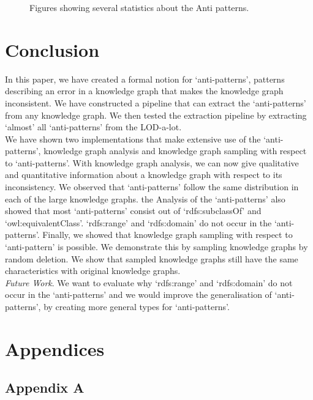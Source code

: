 \documentclass{article}
\begin{document}
\begin{figure}[ht]
{	}
	\caption{Figures showing several statistics about the Anti patterns.}
	\label{fig:AntipatternStats}
\end{figure}

\newpage


\section{Conclusion}
In this paper, we have created a formal notion for `anti-patterns', patterns describing an error in a knowledge graph that makes the knowledge graph inconsistent. 
We have constructed a pipeline that can extract the `anti-patterns' from any knowledge graph. We then tested the extraction pipeline by extracting `almost' all `anti-patterns' from the LOD-a-lot. \\
We have shown two implementations that make extensive use of the `anti-patterns', knowledge graph analysis and knowledge graph sampling with respect to `anti-patterns'.
With knowledge graph analysis, we can now give qualitative and quantitative information about a knowledge graph with respect to its inconsistency. 
We observed that `anti-patterns' follow the same distribution in each of the large knowledge graphs. the Analysis of the `anti-patterns' also showed that most `anti-patterns' consist out of `rdfs:subclassOf' and `owl:equivalentClass'. `rdfs:range' and `rdfs:domain' do not occur in the `anti-patterns'.
Finally, we showed that knowledge graph sampling with respect to `anti-pattern' is possible. We demonstrate this by sampling knowledge graphs by random deletion.
We show that sampled knowledge graphs still have the same characteristics with original knowledge graphs.\\
\textit{Future Work}. We want to evaluate why `rdfs:range' and `rdfs:domain' do not occur in the `anti-patterns' and we would improve the generalisation of `anti-patterns', by creating more general types for `anti-patterns'. 

\newpage



\newpage
\section{Appendices}
\subsection{Appendix A}
\end{document}
